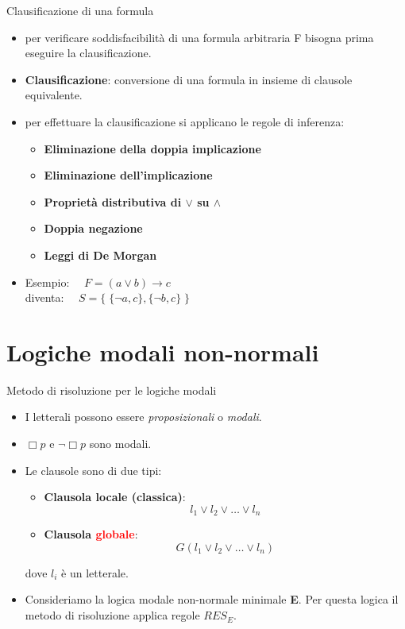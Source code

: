 \documentclass{beamer}
\begin{document}
\begin{frame}{Clausificazione di una formula}
    \begin{itemize}
        \item per verificare soddisfacibilità di una formula arbitraria F bisogna prima eseguire la clausificazione.
        \item \textbf{Clausificazione}: conversione di una formula in insieme di clausole equivalente.
        \item per effettuare la clausificazione si applicano le regole di inferenza:
        \begin{itemize}
            \item \textbf{Eliminazione della doppia implicazione}
            \item \textbf{Eliminazione dell'implicazione}
            \item \textbf{Proprietà distributiva di $\lor$ su $\land$}
            \item \textbf{Doppia negazione}
            \item \textbf{Leggi di De Morgan}
        \end{itemize}
        \item Esempio: $\quad F = (a \lor b) \to c$ \\diventa: $\quad S = \{ \; \{\lnot a, c\}, \{\lnot b, c\} \; \}$
    \end{itemize}
    
\end{frame}

\section{Logiche modali non-normali}
\begin{frame}{Metodo di risoluzione per le logiche modali}
    \begin{itemize}
        \item I letterali possono essere \emph{proposizionali} o \emph{modali}. 
        \item $\Box p$ e $\lnot \Box p$ sono modali.
        \item Le clausole sono di due tipi:
        \begin{itemize}
            \item \textbf{Clausola locale (classica)}: \[ l_1 \lor l_2 \lor \ldots \lor l_n \]
            \item \textbf{Clausola \textcolor{red}{globale}}: \[ G(l_1 \lor l_2 \lor \ldots \lor l_n) \]
        \end{itemize}
        dove $l_i$ è un letterale.
        \item Consideriamo la logica modale non-normale minimale \textbf{E}. Per questa logica il metodo di risoluzione applica regole $RES_E$. 
    \end{itemize}

\end{frame}
\end{document}
